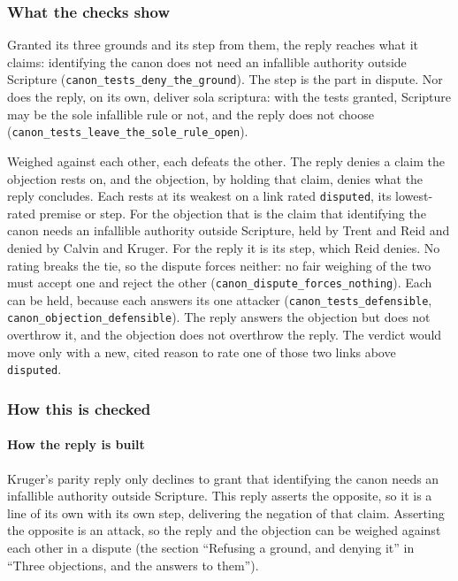 \documentclass[11pt]{article}
\begin{document}
\subsubsection*{What the checks show}
Granted its three grounds and its step from them, the reply reaches what it claims: identifying the canon does not need an infallible authority outside Scripture (\texttt{canon\_\allowbreak{}tests\_\allowbreak{}deny\_\allowbreak{}the\_\allowbreak{}ground}). The step is the part in dispute. Nor does the reply, on its own, deliver sola scriptura: with the tests granted, Scripture may be the sole infallible rule or not, and the reply does not choose (\texttt{canon\_\allowbreak{}tests\_\allowbreak{}leave\_\allowbreak{}the\_\allowbreak{}sole\_\allowbreak{}rule\_\allowbreak{}open}).

Weighed against each other, each defeats the other. The reply denies a claim the objection rests on, and the objection, by holding that claim, denies what the reply concludes. Each rests at its weakest on a link rated \texttt{disputed}, its lowest-rated premise or step. For the objection that is the claim that identifying the canon needs an infallible authority outside Scripture, held by Trent and Reid and denied by Calvin and Kruger. For the reply it is its step, which Reid denies. No rating breaks the tie, so the dispute forces neither: no fair weighing of the two must accept one and reject the other (\texttt{canon\_\allowbreak{}dispute\_\allowbreak{}forces\_\allowbreak{}nothing}). Each can be held, because each answers its one attacker (\texttt{canon\_\allowbreak{}tests\_\allowbreak{}defensible}, \texttt{canon\_\allowbreak{}objection\_\allowbreak{}defensible}). The reply answers the objection but does not overthrow it, and the objection does not overthrow the reply. The verdict would move only with a new, cited reason to rate one of those two links above \texttt{disputed}.

\subsubsection*{How this is checked}
\paragraph*{How the reply is built}
\leavevmode\par\nobreak
Kruger’s parity reply only declines to grant that identifying the canon needs an infallible authority outside Scripture. This reply asserts the opposite, so it is a line of its own with its own step, delivering the negation of that claim. Asserting the opposite is an attack, so the reply and the objection can be weighed against each other in a dispute (the section “Refusing a ground, and denying it” in “Three objections, and the answers to them”).
\end{document}
